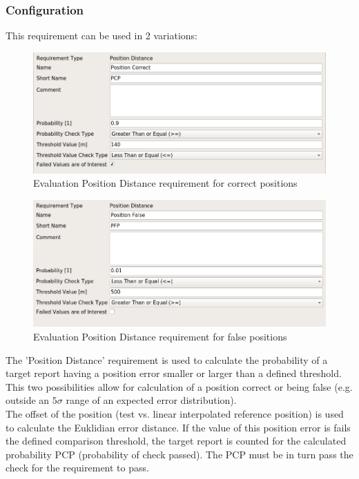 \subsubsection{Configuration}

This requirement can be used in 2 variations:

\begin{figure}[H]
    \includegraphics[width=14cm,frame]{figures/eval_req_pos_distance_correct.png}
  \caption{Evaluation Position Distance requirement for correct positions}
\end{figure}

\begin{figure}[H]
    \includegraphics[width=14cm,frame]{figures/eval_req_pos_distance_false.png}
  \caption{Evaluation Position Distance requirement for false positions}
\end{figure}

The 'Position Distance' requirement is used to calculate the probability of a target report having a position error smaller or larger than a defined threshold. This two possibilities allow for calculation of a position correct or being false (e.g. outside an $5\sigma$ range of an expected error distribution). \\

The offset of the position (test vs. linear interpolated reference position) is used to calculate the Euklidian error distance. If the  value of this position error is fails the defined comparison threshold, the target report is counted for the calculated probability PCP (probability of check passed). The PCP must be in turn pass the check for the requirement to pass. \\

